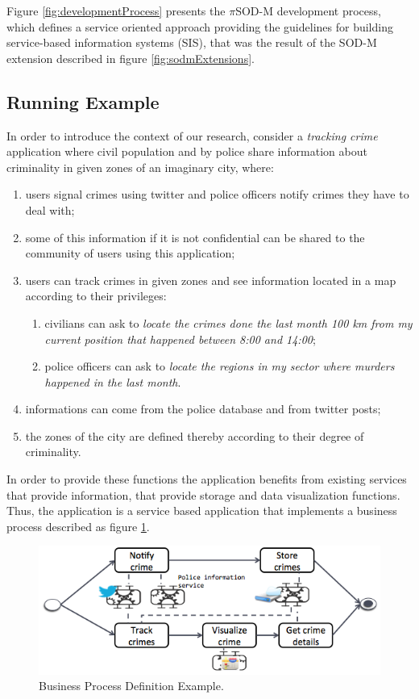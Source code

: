 \documentclass[conference]{IEEEtran}
\begin{document}
 Figure \ref{fig:developmentProcess} presents the $\pi$SOD-M development
 process, which defines a service oriented approach providing the guidelines for
 building service-based information systems (SIS), that was the result of the
 SOD-M extension described in figure \ref{fig:sodmExtensions}. 
 
\subsection{Running Example}


In order to introduce the context of our research, consider a \textit{tracking
crime} application where civil population and by police share information about
criminality in given zones of an imaginary city, where: 

\begin{enumerate}
  \item users signal crimes using twitter and police officers notify crimes 
  they have to deal with; 
  \item some of this information if it is not confidential can be shared to the
  community of users using this application;
  \item users can track crimes in given zones and see information located in a
  map according to their privileges: 
  \begin{enumerate}
    \item civilians can ask to \textit{locate the crimes done the last month 100 km
    from my current position that happened between 8:00 and 14:00}; 
    \item police officers can ask to \textit{locate the regions in my sector where
    murders happened in the last month}.
  \end{enumerate}
   \item informations can come from the police database and from twitter
   posts; 
  \item the zones of the city are defined thereby according to their degree of
  criminality.

\end{enumerate}

 In order to provide these functions the application benefits from existing
 services that provide information, that provide storage and data visualization
 functions. Thus, the application is a service based application that implements
 a business process described as figure \ref{fig:example}. 
 \begin{figure}[ht!]
\centering

\includegraphics[width=.5\textwidth]{fig/businessProcess.png}

\caption{Business Process Definition Example.}
\label{fig:example}
\end{figure}
 
\end{document}
